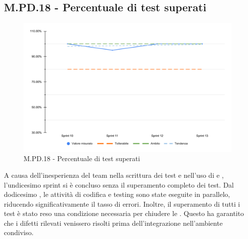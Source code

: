 \subsection{M.PD.18 - Percentuale di test superati}

\begin{figure}[H]
  \centering
  \includegraphics[width=\textwidth]{assets/test_superati.pdf}
  \caption{M.PD.18 - Percentuale di test superati}
\end{figure}

\par A causa dell'inesperienza del team nella scrittura dei test e nell'uso di  e , l'undicesimo sprint si è concluso senza il superamento completo dei test. Dal dodicesimo , le attività di codifica e testing sono state eseguite in parallelo, riducendo significativamente il tasso di errori. Inoltre, il superamento di tutti i test è stato reso una condizione necessaria per chiudere le . Questo ha garantito che i difetti rilevati venissero risolti prima dell'integrazione nell'ambiente condiviso.